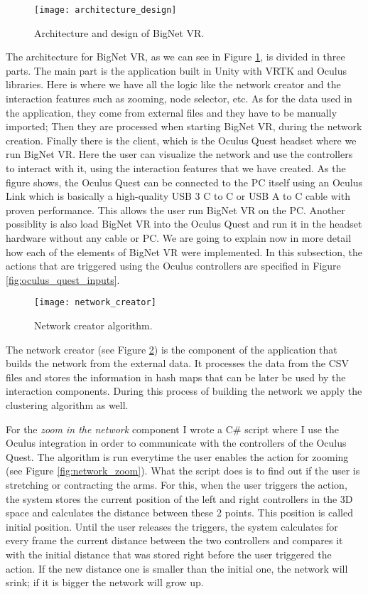 \begin{figure}[h!]
    \centering%
    \texttt{[image: architecture\_design]}
    \caption{Architecture and design of BigNet VR.}
    \label{fig:architecture_design}
\end{figure}%

The architecture for BigNet VR, as we can see in Figure \ref{fig:architecture_design}, is divided in three parts. The main part is the application built in Unity with VRTK and Oculus libraries. Here is where we have all the logic like the network creator and the interaction features such as zooming, node selector, etc. As for the data used in the application, they come from external files and they have to be manually imported; Then they are processed when starting BigNet VR, during the network creation. Finally there is the client, which is the Oculus Quest headset where we run BigNet VR. Here the user can visualize the network and use the controllers to interact with it, using the interaction features that we have created. As the figure shows, the Oculus Quest can be connected to the PC itself using an Oculus Link which is basically a high-quality USB 3 C to C or USB A to C cable with proven performance\cite{oculus_link}. This allows the user run BigNet VR on the PC. Another possiblity is also load BigNet VR into the Oculus Quest and run it in the headset hardware without any cable or PC. We are going to explain now in more detail how each of the elements of BigNet VR were implemented. In this subsection, the actions that are triggered using the Oculus controllers are specified in Figure \ref{fig:oculus_quest_inputs}.

\begin{figure}[h!]
    \centering%
    \texttt{[image: network\_creator]}
    \caption{Network creator algorithm.}
    \label{fig:network_creator}
\end{figure}%

The network creator (see Figure \ref{fig:network_creator}) is the component of the application that builds the network from the external data. It processes the data from the CSV files and stores the information in hash maps that can be later be used by the interaction components. During this process of building the network we apply the clustering algorithm as well.

For the \textit{zoom in the network} component I wrote a C\# script where I use the Oculus integration in order to communicate with the controllers of the Oculus Quest. The algorithm is run everytime the user enables the action for zooming (see Figure \ref{fig:network_zoom}). What the script does is to find out if the user is stretching or contracting the arms. For this, when the user triggers the action, the system stores the current position of the left and right controllers in the 3D space and calculates the distance between these 2 points. This position is called initial position. Until the user releases the triggers, the system calculates for every frame the current distance between the two controllers and compares it with the initial distance that was stored right before the user triggered the action. If the new distance one is smaller than the initial one, the network will srink; if it is bigger the network will grow up.

